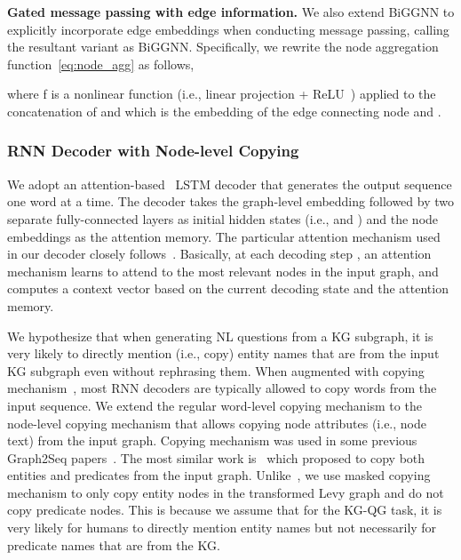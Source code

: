 \documentclass[journal]{IEEEtran}
\begin{document}
\smallskip
\noindent\textbf{Gated message passing with edge information.}
We also extend BiGGNN to explicitly incorporate edge embeddings when conducting message passing, calling the resultant variant as BiGGNN.
Specifically, we rewrite the node aggregation function~\cref{eq:node_agg}
as follows,

where f is a nonlinear function (i.e., linear projection + ReLU~\cite{nair2010rectified}) applied to the concatenation of  and  which is
the embedding of the edge connecting node  and .






\subsubsection{RNN Decoder with Node-level Copying}

We adopt an attention-based~\cite{bahdanau2014neural,luong2015effective} LSTM decoder that generates the output sequence one word at a time.
The decoder takes the graph-level embedding  followed by two separate fully-connected layers as initial hidden states (i.e.,  and ) and the node embeddings  as the attention memory.
The particular attention mechanism used in our decoder closely follows~\cite{see2017get}.
Basically, at each decoding step , an attention mechanism learns to attend to the most relevant nodes in the input graph, and computes a context vector  based on the current decoding state  and the attention memory.



We hypothesize that when generating NL questions from a KG subgraph, it is very likely to directly mention (i.e., copy) entity names that are from the input KG subgraph even without rephrasing them.
When augmented with copying mechanism~\cite{vinyals2015pointer,gu2016incorporating}, most RNN decoders are typically allowed to copy words from the input sequence.
We extend the regular word-level copying mechanism to the node-level copying mechanism that
allows copying node attributes (i.e., node text) from the input graph.
Copying mechanism was used in some previous Graph2Seq papers~\cite{marcheggiani2018deep,koncel2019text}. The most similar work is~\cite{koncel2019text} which proposed to copy both entities and predicates from the input graph. Unlike~\cite{koncel2019text}, we use masked copying mechanism to only copy entity nodes in the transformed Levy graph and do not copy predicate nodes. This is because we assume that for the KG-QG task, it is very likely for humans to directly mention entity names but not necessarily for predicate names that are from the KG. 
\end{document}

